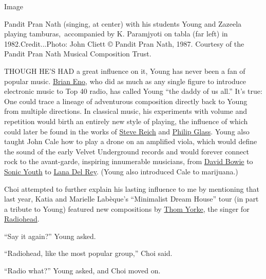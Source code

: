 Image

Pandit Pran Nath (singing, at center) with his students Young and
Zazeela playing tamburas,~accompanied by K. Paramjyoti on tabla (far
left) in 1982.Credit...Photo: John Cliett © Pandit Pran Nath, 1987.
Courtesy of the Pandit Pran Nath Musical Composition Trust.

THOUGH HE'S HAD a great influence on it, Young has never been a fan of
popular music.
\href{https://www.nytimes3xbfgragh.onion/2020/04/29/arts/music/brian-eno-ambient-songs.html}{Brian
Eno}, who did as much as any single figure to introduce electronic music
to Top 40 radio, has called Young ``the daddy of us all.'' It's true:
One could trace a lineage of adventurous composition directly back to
Young from multiple directions. In classical music, his experiments with
volume and repetition would birth an entirely new style of playing, the
influence of which could later be found in the works of
\href{https://www.nytimes3xbfgragh.onion/2016/10/02/arts/music/steve-reich-at-80-still-plugged-in-still-plugging-away.html}{Steve
Reich} and
\href{https://www.nytimes3xbfgragh.onion/topic/person/philip-glass}{Philip
Glass}. Young also taught John Cale how to play a drone on an amplified
viola, which would define the sound of the early Velvet Underground
records and would forever connect rock to the avant-garde, inspiring
innumerable musicians, from
\href{https://www.nytimes3xbfgragh.onion/topic/person/david-bowie}{David
Bowie} to
\href{https://www.nytimes3xbfgragh.onion/2019/09/14/style/kim-gordons-other-life.html}{Sonic
Youth} to
\href{https://www.nytimes3xbfgragh.onion/2019/08/28/arts/music/lana-del-rey-norman-rockwell-album.html}{Lana
Del Rey}. (Young also introduced Cale to marijuana.)

Choi attempted to further explain his lasting influence to me by
mentioning that last year, Katia and Marielle Labèque's ``Minimalist
Dream House'' tour (in part a tribute to Young) featured new
compositions by
\href{https://www.nytimes3xbfgragh.onion/interactive/2019/10/28/magazine/thom-yorke-radiohead-interview.html}{Thom
Yorke}, the singer for
\href{https://www.nytimes3xbfgragh.onion/topic/organization/radiohead}{Radiohead}.

``Say it again?'' Young asked.

``Radiohead, like the most popular group,'' Choi said.

``Radio what?'' Young asked, and Choi moved on.

